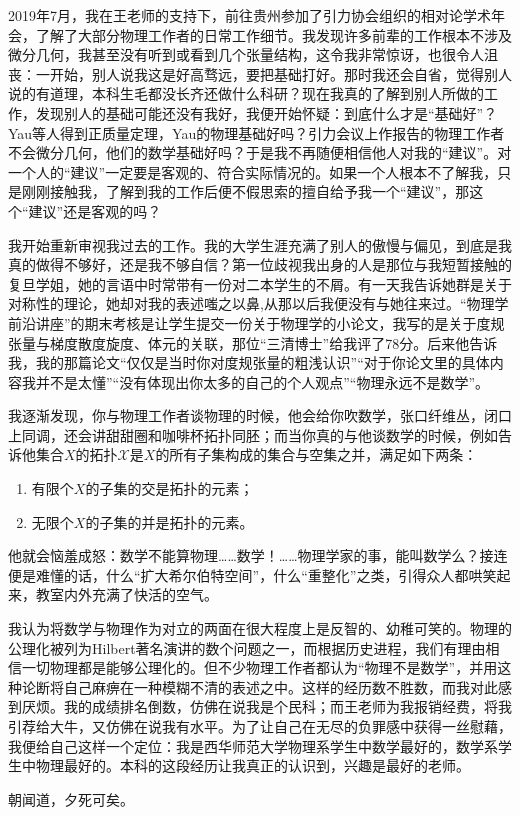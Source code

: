 	    2019年7月，我在王老师的支持下，前往贵州参加了引力协会组织的相对论学术年会，了解了大部分物理工作者的日常工作细节。我发现许多前辈的工作根本不涉及微分几何，我甚至没有听到或看到几个张量结构，这令我非常惊讶，也很令人沮丧：一开始，别人说我这是好高骛远，要把基础打好。那时我还会自省，觉得别人说的有道理，本科生毛都没长齐还做什么科研？现在我真的了解到别人所做的工作，发现别人的基础可能还没有我好，我便开始怀疑：到底什么才是“基础好”？Yau等人得到正质量定理，Yau的物理基础好吗？引力会议上作报告的物理工作者不会微分几何，他们的数学基础好吗？于是我不再随便相信他人对我的“建议”。对一个人的“建议”一定要是客观的、符合实际情况的。如果一个人根本不了解我，只是刚刚接触我，了解到我的工作后便不假思索的擅自给予我一个“建议”，那这个“建议”还是客观的吗？

	    我开始重新审视我过去的工作。我的大学生涯充满了别人的傲慢与偏见，到底是我真的做得不够好，还是我不够自信？第一位歧视我出身的人是那位与我短暂接触的复旦学姐，她的言语中时常带有一份对二本学生的不屑。有一天我告诉她群是关于对称性的理论，她却对我的表述嗤之以鼻,从那以后我便没有与她往来过。“物理学前沿讲座”的期末考核是让学生提交一份关于物理学的小论文，我写的是关于度规张量与梯度散度旋度、体元的关联，那位“三清博士”给我评了78分。后来他告诉我，我的那篇论文“仅仅是当时你对度规张量的粗浅认识”“对于你论文里的具体内容我并不是太懂”“没有体现出你太多的自己的个人观点”“物理永远不是数学”。

        我逐渐发现，你与物理工作者谈物理的时候，他会给你吹数学，张口纤维丛，闭口上同调，还会讲甜甜圈和咖啡杯拓扑同胚；而当你真的与他谈数学的时候，例如告诉他集合$X$的拓扑$\mathcal{X}$是$X$的所有子集构成的集合与空集之并，满足如下两条：
	    \begin{enumerate}
		    \item 有限个$X$的子集的交是拓扑的元素；
		    \item 无限个$X$的子集的并是拓扑的元素。
	    \end{enumerate}
	    他就会恼羞成怒：数学不能算物理……数学！……物理学家的事，能叫数学么？接连便是难懂的话，什么“扩大希尔伯特空间”，什么“重整化”之类，引得众人都哄笑起来，教室内外充满了快活的空气。

	    我认为将数学与物理作为对立的两面在很大程度上是反智的、幼稚可笑的。物理的公理化被列为Hilbert著名演讲的数个问题之一，而根据历史进程，我们有理由相信一切物理都是能够公理化的。但不少物理工作者都认为“物理不是数学”，并用这种论断将自己麻痹在一种模糊不清的表述之中。这样的经历数不胜数，而我对此感到厌烦。我的成绩排名倒数，仿佛在说我是个民科；而王老师为我报销经费，将我引荐给大牛，又仿佛在说我有水平。为了让自己在无尽的负罪感中获得一丝慰藉，我便给自己这样一个定位：我是西华师范大学物理系学生中数学最好的，数学系学生中物理最好的。本科的这段经历让我真正的认识到，兴趣是最好的老师。

        朝闻道，夕死可矣。


